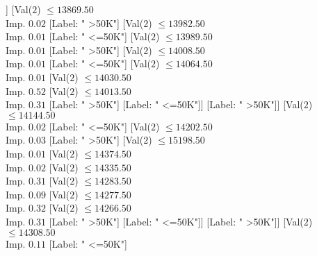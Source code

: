 \documentclass[margin=10pt]{standalone}
\begin{document}
\begin{forest}
																															[Label: " <=50K"]]
																														[Val($2$) $ \leq 13869.50$ \\ Imp. $0.02$
																															[Label: " >50K"]
																															[Val($2$) $ \leq 13982.50$ \\ Imp. $0.01$
																																[Label: " <=50K"]
																																[Val($2$) $ \leq 13989.50$ \\ Imp. $0.01$
																																	[Label: " >50K"]
																																	[Val($2$) $ \leq 14008.50$ \\ Imp. $0.01$
																																		[Label: " <=50K"]
																																		[Val($2$) $ \leq 14064.50$ \\ Imp. $0.01$
																																			[Val($2$) $ \leq 14030.50$ \\ Imp. $0.52$
																																				[Val($2$) $ \leq 14013.50$ \\ Imp. $0.31$
																																					[Label: " >50K"]
																																					[Label: " <=50K"]]
																																				[Label: " >50K"]]
																																			[Val($2$) $ \leq 14144.50$ \\ Imp. $0.02$
																																				[Label: " <=50K"]
																																				[Val($2$) $ \leq 14202.50$ \\ Imp. $0.03$
																																					[Label: " >50K"]
																																					[Val($2$) $ \leq 15198.50$ \\ Imp. $0.01$
																																						[Val($2$) $ \leq 14374.50$ \\ Imp. $0.02$
																																							[Val($2$) $ \leq 14335.50$ \\ Imp. $0.31$
																																								[Val($2$) $ \leq 14283.50$ \\ Imp. $0.09$
																																									[Val($2$) $ \leq 14277.50$ \\ Imp. $0.32$
																																										[Val($2$) $ \leq 14266.50$ \\ Imp. $0.31$
																																											[Label: " >50K"]
																																											[Label: " <=50K"]]
																																										[Label: " >50K"]]
																																									[Val($2$) $ \leq 14308.50$ \\ Imp. $0.11$
																																										[Label: " <=50K"]

\end{forest}
\end{document}

